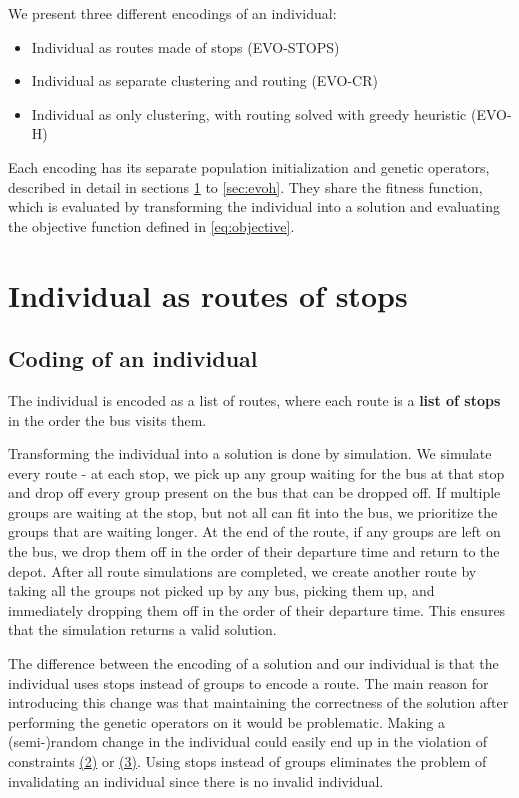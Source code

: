 \hspace{0pt}

We present three different encodings of an individual:

\begin{itemize}
    \item Individual as routes made of stops (EVO-STOPS)
    \item Individual as separate clustering and routing (EVO-CR)
    \item Individual as only clustering, with routing solved with greedy heuristic (EVO-H)
\end{itemize}

Each encoding has its separate population initialization and genetic operators, described in detail in sections \ref{sec:evo-stops} to \ref{sec:evoh}. They share the fitness function, which is evaluated by transforming the individual into a solution and evaluating the objective function defined in \ref{eq:objective}.

\section{Individual as routes of stops}\label{sec:evo-stops}

\subsection{Coding of an individual}

The individual is encoded as a list of routes, where each route is a \textbf{list of stops} in the order the bus visits them.

Transforming the individual into a solution is done by simulation.  We simulate every route - at each stop, we pick up any group waiting for the bus at that stop and drop off every group present on the bus that can be dropped off. If multiple groups are waiting at the stop, but not all can fit into the bus, we prioritize the groups that are waiting longer. At the end of the route, if any groups are left on the bus, we drop them off in the order of their departure time and return to the depot. \label{evostops-catchroute}After all route simulations are completed, we create another route by taking all the groups not picked up by any bus, picking them up, and immediately dropping them off in the order of their departure time. This ensures that the simulation returns a valid solution.

The difference between the encoding of a solution and our individual is that the individual uses stops instead of groups to encode a route. The main reason for introducing this change was that maintaining the correctness of the solution after performing the genetic operators on it would be problematic. Making a (semi-)random change in the individual could easily end up in the violation of constraints \hyperref[constraints]{(2)} or \hyperref[constraints]{(3)}. Using stops instead of groups eliminates the problem of invalidating an individual since there is no invalid individual.

